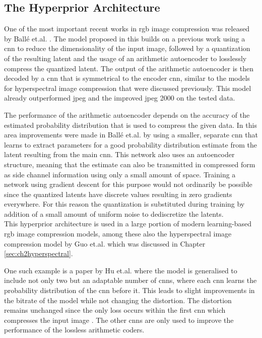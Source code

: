 \subsection{The Hyperprior Architecture}
One of the most important recent works in \ac{rgb} image compression was released by Ballé et.al. \citep{balle_variational_2018}. The model proposed in this builds on a previous work \citep{balle_end--end_2017} using a \ac{cnn} to reduce the dimensionality of the input image, followed by a quantization of the resulting latent and the usage of an arithmetic autoencoder to losslessly compress the quantized latent. The output of the arithmetic autoencoder is then decoded by a \ac{cnn} that is symmetrical to the encoder \ac{cnn}, similar to the models for hyperspectral image compression that were discussed previously. This model already outperformed \ac{jpeg} and the improved \ac{jpeg} 2000 on the tested data.

The performance of the arithmetic autoencoder depends on the accuracy of the estimated probability distribution that is used to compress the given data. In this area improvements were made in Ballé et.al. \citep{balle_variational_2018} by using a smaller, separate \ac{cnn} that learns to extract parameters for a good probability distribution estimate from the latent resulting from the main \ac{cnn}. This network also uses an autoencoder structure, meaning that the estimate can also be transmitted in compressed form as side channel information using only a small amount of space. Training a network using gradient descent for this purpose would not ordinarily be possible since the quantized latents have discrete values resulting in zero gradients everywhere. For this reason the quantization is substituted during training by addition of a small amount of uniform noise to dediscretize the latents.\\
This hyperprior architecture is used in a large portion of modern learning-based \ac{rgb} image compression models, among these also the hyperspectral image compression model by Guo et.al. \citep{guo_learned_2021} which was discussed in Chapter \ref{sec:ch2hyperspectral}.

One such example is a paper by Hu et.al. \citep{hu_coarse--fine_2020} where the model is generalised to include not only two but an adaptable number of \acp{cnn}, where each \ac{cnn} learns the probability distribution of the \ac{cnn} before it. This leads to slight improvements in the bitrate of the model while not changing the distortion. The distortion remains unchanged since the only loss occurs within the first \ac{cnn} which compresses the input image . The other \acp{cnn} are only used to improve the performance of the lossless arithmetic coders.

